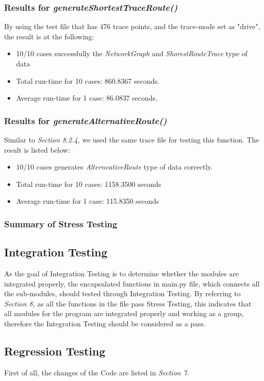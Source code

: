 \documentclass[12pt, titlepage]{article}
\begin{document}
\subsubsection{Results for \emph{generateShortestTraceRoute()}}
By using the test file that has 476 trace points, and the trace-mode set as "drive", the result is at the following:
\begin{itemize}
    \item 10/10 cases successfully the \emph{NetworkGraph} and \emph{ShorestRouteTrace} type of data
    \item Total run-time for 10 cases: 860.8367 seconds.
    \item Average run-time for 1 case: 86.0837 seconds.
\end{itemize}

\subsubsection{Results for \emph{generateAlternativeRoute()}}
Similar to \emph{Section 8.2.4, } we used the same trace file for testing this function. The result is listed below:
\begin{itemize}
    \item 10/10 cases generates \emph{AlternvativeRoute} type of data correctly.
    \item Total run-time for 10 cases: 1158.3500 seconds
    \item Average run-time for 1 case: 115.8350 seconds
\end{itemize}

\subsubsection{Summary of Stress Testing}

\subsection{Integration Testing}
As the goal of Integration Testing is to determine whether the modules are integrated properly, the encapsulated functions in main.py file, which connects all the sub-modules, should tested through Integration Testing. By referring to \emph{Section 8,} as all the functions in the file pass Stress Testing, this indicates that all modules for the program are integrated properly and working as a group, therefore the Integration Testing should be considered as a pass.

\subsection{Regression Testing}
First of all, the changes of the Code are listed in \emph{Section 7.}\\
\end{document}

